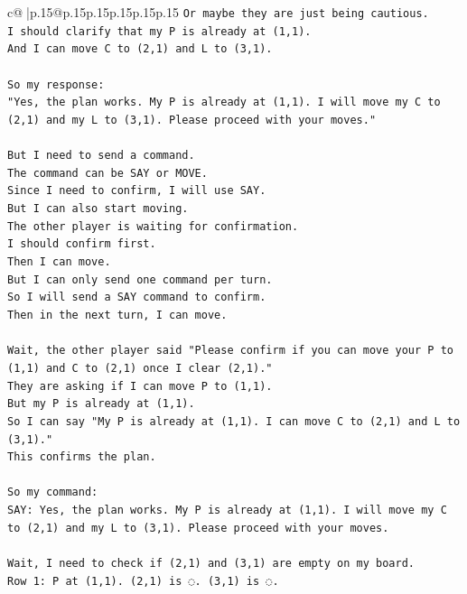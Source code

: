 \documentclass{article}
\begin{document}
{\begin{supertabular}{c@{$\;$}|p{.15\linewidth}@{}p{.15\linewidth}p{.15\linewidth}p{.15\linewidth}p{.15\linewidth}p{.15\linewidth}}
{{{\texttt{Or maybe they are just being cautious.} \\
\texttt{I should clarify that my P is already at (1,1).} \\
\texttt{And I can move C to (2,1) and L to (3,1).} \\
\\ 
\texttt{So my response:} \\
\texttt{"Yes, the plan works. My P is already at (1,1). I will move my C to (2,1) and my L to (3,1). Please proceed with your moves."} \\
\\ 
\texttt{But I need to send a command.} \\
\texttt{The command can be SAY or MOVE.} \\
\texttt{Since I need to confirm, I will use SAY.} \\
\texttt{But I can also start moving.} \\
\texttt{The other player is waiting for confirmation.} \\
\texttt{I should confirm first.} \\
\texttt{Then I can move.} \\
\texttt{But I can only send one command per turn.} \\
\texttt{So I will send a SAY command to confirm.} \\
\texttt{Then in the next turn, I can move.} \\
\\ 
\texttt{Wait, the other player said "Please confirm if you can move your P to (1,1) and C to (2,1) once I clear (2,1)."} \\
\texttt{They are asking if I can move P to (1,1).} \\
\texttt{But my P is already at (1,1).} \\
\texttt{So I can say "My P is already at (1,1). I can move C to (2,1) and L to (3,1)."} \\
\texttt{This confirms the plan.} \\
\\ 
\texttt{So my command:} \\
\texttt{SAY: Yes, the plan works. My P is already at (1,1). I will move my C to (2,1) and my L to (3,1). Please proceed with your moves.} \\
\\ 
\texttt{Wait, I need to check if (2,1) and (3,1) are empty on my board.} \\
\texttt{Row 1: P at (1,1). (2,1) is ◌. (3,1) is ◌.} \\
}}}
\end{supertabular}}
\end{document}
